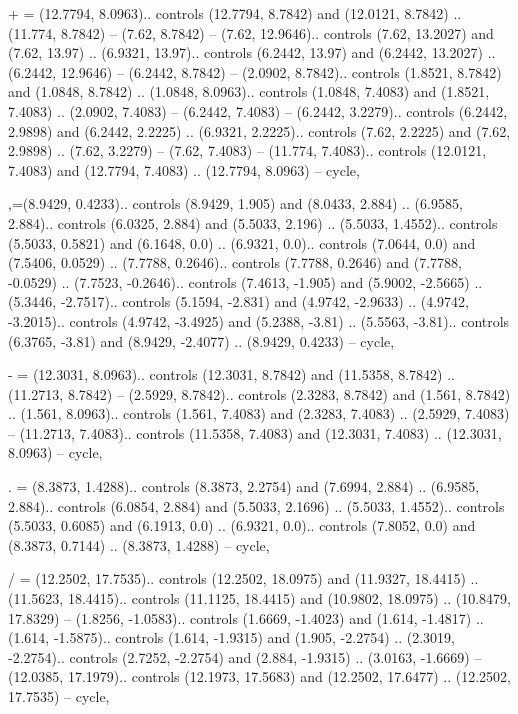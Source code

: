 + = {(12.7794, 8.0963).. controls (12.7794, 8.7842) and (12.0121, 8.7842) .. (11.774, 8.7842) -- (7.62, 8.7842) -- (7.62, 12.9646).. controls (7.62, 13.2027) and (7.62, 13.97) .. (6.9321, 13.97).. controls (6.2442, 13.97) and (6.2442, 13.2027) .. (6.2442, 12.9646) -- (6.2442, 8.7842) -- (2.0902, 8.7842).. controls (1.8521, 8.7842) and (1.0848, 8.7842) .. (1.0848, 8.0963).. controls (1.0848, 7.4083) and (1.8521, 7.4083) .. (2.0902, 7.4083) -- (6.2442, 7.4083) -- (6.2442, 3.2279).. controls (6.2442, 2.9898) and (6.2442, 2.2225) .. (6.9321, 2.2225).. controls (7.62, 2.2225) and (7.62, 2.9898) .. (7.62, 3.2279) -- (7.62, 7.4083) -- (11.774, 7.4083).. controls (12.0121, 7.4083) and (12.7794, 7.4083) .. (12.7794, 8.0963) -- cycle},

{,}={(8.9429, 0.4233).. controls (8.9429, 1.905) and (8.0433, 2.884) .. (6.9585, 2.884).. controls (6.0325, 2.884) and (5.5033, 2.196) .. (5.5033, 1.4552).. controls (5.5033, 0.5821) and (6.1648, 0.0) .. (6.9321, 0.0).. controls (7.0644, 0.0) and (7.5406, 0.0529) .. (7.7788, 0.2646).. controls (7.7788, 0.2646) and (7.7788, -0.0529) .. (7.7523, -0.2646).. controls (7.4613, -1.905) and (5.9002, -2.5665) .. (5.3446, -2.7517).. controls (5.1594, -2.831) and (4.9742, -2.9633) .. (4.9742, -3.2015).. controls (4.9742, -3.4925) and (5.2388, -3.81) .. (5.5563, -3.81).. controls (6.3765, -3.81) and (8.9429, -2.4077) .. (8.9429, 0.4233) -- cycle},

- = {(12.3031, 8.0963).. controls (12.3031, 8.7842) and (11.5358, 8.7842) .. (11.2713, 8.7842) -- (2.5929, 8.7842).. controls (2.3283, 8.7842) and (1.561, 8.7842) .. (1.561, 8.0963).. controls (1.561, 7.4083) and (2.3283, 7.4083) .. (2.5929, 7.4083) -- (11.2713, 7.4083).. controls (11.5358, 7.4083) and (12.3031, 7.4083) .. (12.3031, 8.0963) -- cycle},

. = {(8.3873, 1.4288).. controls (8.3873, 2.2754) and (7.6994, 2.884) .. (6.9585, 2.884).. controls (6.0854, 2.884) and (5.5033, 2.1696) .. (5.5033, 1.4552).. controls (5.5033, 0.6085) and (6.1913, 0.0) .. (6.9321, 0.0).. controls (7.8052, 0.0) and (8.3873, 0.7144) .. (8.3873, 1.4288) -- cycle},

/ = {(12.2502, 17.7535).. controls (12.2502, 18.0975) and (11.9327, 18.4415) .. (11.5623, 18.4415).. controls (11.1125, 18.4415) and (10.9802, 18.0975) .. (10.8479, 17.8329) -- (1.8256, -1.0583).. controls (1.6669, -1.4023) and (1.614, -1.4817) .. (1.614, -1.5875).. controls (1.614, -1.9315) and (1.905, -2.2754) .. (2.3019, -2.2754).. controls (2.7252, -2.2754) and (2.884, -1.9315) .. (3.0163, -1.6669) -- (12.0385, 17.1979).. controls (12.1973, 17.5683) and (12.2502, 17.6477) .. (12.2502, 17.7535) -- cycle},

